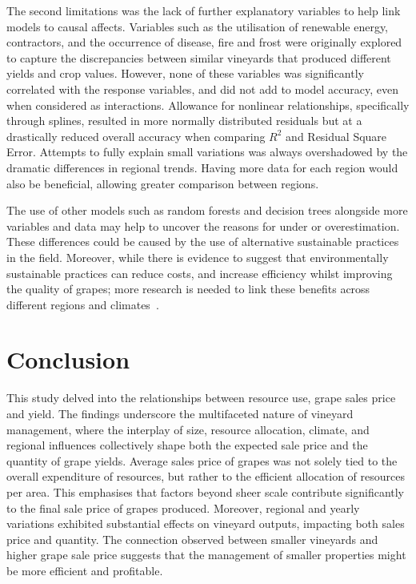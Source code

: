 \documentclass[10pt,letterpaper]{article}
\begin{document}
\par
The second limitations was the lack of further explanatory variables to help link models to causal affects. Variables such as the utilisation of renewable energy, contractors, and the occurrence of disease, fire and frost were originally explored to capture the discrepancies between similar vineyards that produced different yields and crop values. However, none of these variables was significantly correlated with the response variables, and did not add to model accuracy, even when considered as interactions. Allowance for nonlinear relationships, specifically through splines, resulted in more normally distributed residuals but at a drastically reduced overall accuracy when comparing $R^2$ and Residual Square Error. Attempts to fully explain small variations was always overshadowed by the dramatic differences in regional trends. Having more data for each region would also be beneficial, allowing greater comparison between regions.
\par
The use of other models such as random forests and decision trees alongside more variables and data may help to uncover the reasons for under or overestimation. These differences could be caused by the use of alternative sustainable practices in the field. Moreover, while there is evidence to suggest that environmentally sustainable practices can reduce costs, and increase efficiency whilst improving the quality of grapes; more research is needed to link these benefits across different regions and climates~\cite{baianoOverviewSustainabilityWine2021,marianiSustainableWinegrowingCurrent2015,montalvo-falconSustainabilityResearchWine2023}.
\section*{Conclusion}

This study delved into the relationships between resource use, grape sales price and yield. The findings underscore the multifaceted nature of vineyard management, where the interplay of size, resource allocation, climate, and regional influences collectively shape both the expected sale price and the quantity of grape yields. Average sales price of grapes was not solely tied to the overall expenditure of resources, but rather to the efficient allocation of resources per area. This emphasises that factors beyond sheer scale contribute significantly to the final sale price of grapes produced. Moreover, regional and yearly variations exhibited substantial effects on vineyard outputs, impacting both sales price and quantity. The connection observed between smaller vineyards and higher grape sale price suggests that the management of smaller properties might be more efficient and profitable.
\end{document}
